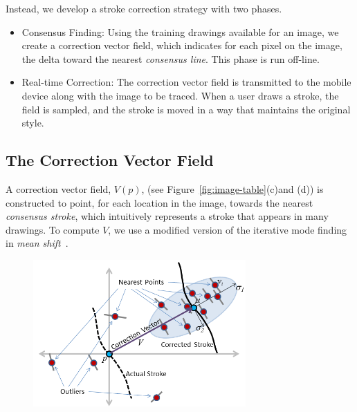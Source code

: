 Instead, we develop a stroke correction strategy with two phases.
\begin{itemize}
\item Consensus Finding: Using the training drawings available for an image, we create a correction vector field, which indicates for each pixel on the image, the delta toward the nearest {\em consensus line}.  This phase is run off-line.
\item Real-time Correction: The correction vector field is transmitted to the mobile device along with the image to be traced.  When a user draws a stroke, the field is sampled, and the stroke is moved in a way that maintains the original style.
\end{itemize}

\subsection{The Correction Vector Field}


A correction vector field, $V(p)$, (see Figure~\ref{fig:image-table}(c)and (d)) is constructed to point, for each location in the image, towards the nearest {\em consensus stroke}, which intuitively represents a stroke that appears in many drawings. To compute $V$, we use a modified version of the iterative mode finding in {\em mean shift}~\cite{10.1109/ICCV.1999.790416}.


\begin{figure}
  \centering%
  \includegraphics[width=3.2in]{ellipse.png}
  \caption{  }
  \label{fig:ellipse}
\end{figure}

